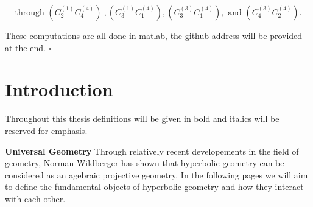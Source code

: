 \documentclass[11pt]{article}
\begin{document}
\begin{equation*}
\text{through }\left( C_{2}^{\left( 1\right) }C_{4}^{\left( 4\right)
}\right) \ ,\left( C_{3}^{\left( 1\right) }C_{1}^{\left( 4\right) }\right)
,\left( C_{3}^{\left( 3\right) }C_{1}^{\left( 4\right) }\right) ,\text{ and }%
\left( C_{4}^{\left( 3\right) }C_{2}^{\left( 4\right) }\right) .
\end{equation*}

These computations are all done in matlab, the github address will be
provided at the end. $\square $

\bigskip \pagebreak

\section{\protect\bigskip Introduction}

Throughout this thesis definitions will be given in bold and italics will be
reserved for emphasis.\newline

\textbf{Universal Geometry} Through relatively recent developements in the
field of geometry, Norman Wildberger has shown that hyperbolic geometry can
be considered as an agebraic projective geometry. In the following pages we
will aim to define the fundamental objects of hyperbolic geometry and how
they interact with each other.\newline
\end{document}

